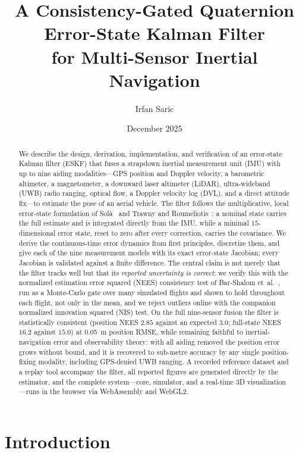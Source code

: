 \documentclass[11pt]{article}
\title{\textbf{A Consistency-Gated Quaternion Error-State Kalman Filter\\[2pt]
for Multi-Sensor Inertial Navigation}}
\author{Irfan Saric}
\date{December 2025}
\begin{document}
\maketitle

\begin{abstract}
\noindent
We describe the design, derivation, implementation, and verification of an error-state Kalman filter
(ESKF) that fuses a strapdown inertial measurement unit (IMU) with up to nine aiding
modalities---GPS position and Doppler velocity, a barometric altimeter, a magnetometer, a downward
laser altimeter (LiDAR), ultra-wideband (UWB) radio ranging, optical flow, a Doppler velocity log
(DVL), and a direct attitude fix---to estimate the pose of an aerial vehicle. The filter follows the
multiplicative, local error-state formulation of Sol\`a~\cite{sola2017} and Trawny and
Roumeliotis~\cite{trawny2005}: a nominal state carries the full estimate and is integrated directly
from the IMU, while a minimal $15$-dimensional error state, reset to zero after every correction,
carries the covariance. We derive the continuous-time error dynamics from first principles, discretize
them, and give each of the nine measurement models with its exact error-state Jacobian; every Jacobian
is validated against a finite difference. The central claim is not merely that the filter tracks well
but that its \emph{reported uncertainty is correct}: we verify this with the normalized estimation
error squared (NEES) consistency test of Bar-Shalom et~al.~\cite{barshalom2001}, run as a Monte-Carlo
gate over many simulated flights and shown to hold throughout each flight, not only in the mean, and we
reject outliers online with the companion normalized innovation squared (NIS) test. On the full
nine-sensor fusion the filter is statistically consistent (position NEES $2.85$ against an expected
$3.0$; full-state NEES $16.2$ against $15.0$) at \SI{0.05}{\metre} position RMSE, while remaining
faithful to inertial-navigation error and observability theory: with all aiding removed the position
error grows without bound, and it is recovered to sub-metre accuracy by any single position-fixing
modality, including GPS-denied UWB ranging. A recorded reference dataset and a replay tool accompany
the filter, all reported figures are generated directly by the estimator, and the complete
system---core, simulator, and a real-time 3D visualization---runs in the browser via WebAssembly and
WebGL2.
\end{abstract}

\section{Introduction}
\end{document}
